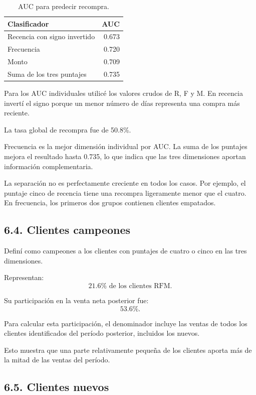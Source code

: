 \documentclass[11pt,letterpaper]{article}
\begin{document}
\begin{table}[H]
\centering
\caption{AUC para predecir recompra.}
\begin{tabular}{lr}
\toprule
Clasificador & AUC\\
\midrule
Recencia con signo invertido & 0.673\\
Frecuencia & 0.720\\
Monto & 0.709\\
Suma de los tres puntajes & 0.735\\
\bottomrule
\end{tabular}
\end{table}

Para los AUC individuales utilicé los valores crudos de R, F y M. En recencia invertí el signo porque un menor número de días representa una compra más reciente.

La tasa global de recompra fue de 50.8\%.

Frecuencia es la mejor dimensión individual por AUC. La suma de los puntajes mejora el resultado hasta 0.735, lo que indica que las tres dimensiones aportan información complementaria.

La separación no es perfectamente creciente en todos los casos. Por ejemplo, el puntaje cinco de recencia tiene una recompra ligeramente menor que el cuatro. En frecuencia, los primeros dos grupos contienen clientes empatados.

\subsection*{6.4. Clientes campeones}

Definí como campeones a los clientes con puntajes de cuatro o cinco en las tres dimensiones.

Representan:
\[
\boxed{21.6\%\text{ de los clientes RFM}}.
\]

Su participación en la venta neta posterior fue:
\[
\boxed{53.6\%}.
\]

Para calcular esta participación, el denominador incluye las ventas de todos los clientes identificados del período posterior, incluidos los nuevos.

Esto muestra que una parte relativamente pequeña de los clientes aporta más de la mitad de las ventas del período.

\subsection*{6.5. Clientes nuevos}
\end{document}

